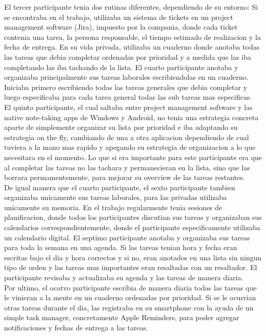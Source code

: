 El tercer participante tenia dos rutinas diferentes, dependiendo de su entorno: Si se encontraba en el trabajo, utilizaba un sistema de tickets en un project management software (Jira), impuesto por la compania, donde cada ticket contenia una tarea, la persona responsable, el tiempo estimado de realizacion y la fecha de entrega. En su vida privada, utilizaba un cuaderno donde anotaba todas las tareas que debia completar ordenadas por prioridad y a medida que las iba completando las iba tachando de la lista.
El cuarto participante anotaba y organizaba principalmente sus tareas laborales escribiendolas en un cuaderno. Iniciaba primero escribiendo todas las tareas generales que debia completar y luego especificaba para cada tarea general todas las sub tareas mas especificas.\\
El quinto participante, el cual saltaba entre project management software y las native note-taking apps de Windows y Android, no tenia una estrategia concreta aparte de simplemente organizar su lista por prioridad e iba adaptando su estrategia on the fly, cambiando de una a otra aplicacion dependiendo de cual tuviera a la mano mas rapido y apegando su estrategia de organizacion a lo que necesitara en el momento. Lo que si era importante para este participante era que al completar las tareas no las tachara y permanecieran en la lista, sino que las borrara permamentemente, para mejorar su overview de las tareas restantes.\\
De igual manera que el cuarto participante, el sexto participante tambien organizaba unicamente sus tareas laborales, para las privadas utilizaba unicamente su memoria. En el trabajo regularmente tenia sesiones de planificacion, donde todos los participantes discutian sus tareas y organizaban sus calendarios correspondientemente, donde el participante especificamente utilizaba un calendario digital. 
El septimo participante anotaba y organizaba sus tareas para toda la semana en una agenda. Si las tareas tenian hora y fecha eran escritas bajo el dia y hora correctos y si no, eran anotados en una lista sin ningun tipo de orden y las tareas mas importantes eran resaltadas con un resaltador. El participante revisaba y actualizaba su agenda y las tareas de manera diaria.\\
Por ultimo, el ocatvo participante escribia de manera diaria todas las tareas que le vinieran a la mente en un cuaderno ordenadas por prioridad. Si se le ocurrian otras tareas durante el dia, las registraba en su smartphone con la ayuda de un simple task manager, concretamente Apple Reminders, para poder agregar notificaciones y fechas de entrega a las tareas.

